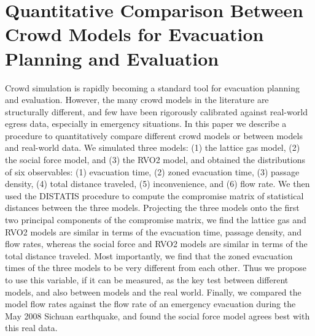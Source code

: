 
\chapter{Quantitative Comparison Between Crowd Models for Evacuation Planning and Evaluation}
\label{chapter:MotionPlannerComparison}


Crowd simulation is rapidly becoming a standard tool for evacuation planning and evaluation. However, the many crowd models in the literature are structurally different, and few have been rigorously calibrated against real-world egress data, especially in emergency situations. In this paper we describe a procedure to quantitatively compare different crowd models or between models and real-world data. We simulated three models: (1) the lattice gas model, (2) the social force model, and (3) the RVO2 model, and obtained the distributions of six observables: (1) evacuation time, (2) zoned evacuation time, (3) passage density, (4) total distance traveled, (5) inconvenience, and (6) flow rate. We then used the DISTATIS procedure to compute the compromise matrix of statistical distances between the three models. Projecting the three models onto the first two principal components of the compromise matrix, we find the lattice gas and RVO2 models are similar in terms of the evacuation time, passage density, and flow rates, whereas the social force and RVO2 models are similar in terms of the total distance traveled. Most importantly, we find that the zoned evacuation times of the three models to be very different from each other. Thus we propose to use this variable, if it can be measured, as the key test between different models, and also between models and the real world. Finally, we compared the model flow rates against the flow rate of an emergency evacuation during the May 2008 Sichuan earthquake, and found the social force model agrees best with this real data.
%

